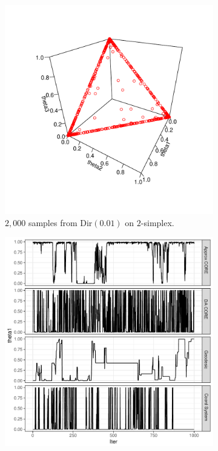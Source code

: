 \documentclass[10pt,fleqn]{article}
\DeclareMathOperator{\1}{\mathbbm{1}}
\begin{document}
\begin{figure}[H]
\begin{subfigure}[b]{0.45\textwidth}
\includegraphics[width=1\textwidth]{simplex001}
\caption{$2,000$ samples from $\text{Dir}(0.01)$ on $2$-simplex.}
\end{subfigure}
\begin{subfigure}[b]{0.45\textwidth}
\includegraphics[width=1\textwidth]{simplexTrace001}

\end{subfigure}
\end{figure}
\end{document}

